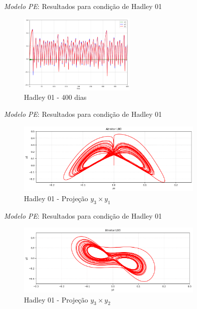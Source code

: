 
\begin{frame}{\textit{Modelo PE}: Resultados para condição de Hadley 01}
	\begin{figure}
		\centering
		\includegraphics[width=0.5\textwidth]{img/p02d260.png}
		\caption{Hadley 01 - 400 dias}
		\label{fig:p02}
	\end{figure}
\end{frame}


\begin{frame}{\textit{Modelo PE}: Resultados para condição de Hadley 01}
	\begin{figure}
		\centering
		\includegraphics[width=0.8\textwidth]{img/p02y3y1.png}
		\caption{Hadley 01 - Projeção $y_3 \times y_1$}
		\label{fig:p02y3y1}
	\end{figure}
\end{frame}


\begin{frame}{\textit{Modelo PE}: Resultados para condição de Hadley 01}
	\begin{figure}
		\centering
		\includegraphics[width=0.8\textwidth]{img/p02y3y2.png}
		\caption{Hadley 01 - Projeção $y_3 \times y_2$}
		\label{fig:p02y3y2}
	\end{figure}
\end{frame}


